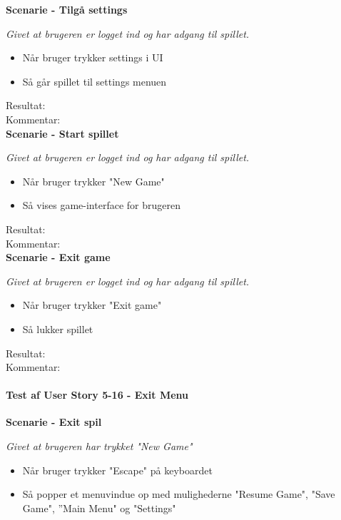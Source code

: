 \textbf{Scenarie - Tilgå settings}

\textit{Givet at brugeren er logget ind og har adgang til spillet.}

\begin{itemize}
  \item Når bruger trykker settings i UI
  \item Så går spillet til settings menuen
\end{itemize}

Resultat:\\
Kommentar:\\

\textbf{Scenarie - Start spillet}

\textit{Givet at brugeren er logget ind og har adgang til spillet.}

\begin{itemize}
  \item Når bruger trykker "New Game"
  \item Så vises game-interface for brugeren
\end{itemize}

Resultat:\\
Kommentar:\\

\textbf{Scenarie - Exit game}

\textit{Givet at brugeren er logget ind og har adgang til spillet.}

\begin{itemize}
  \item Når bruger trykker "Exit game"
  \item Så lukker spillet
\end{itemize}

Resultat:\\
Kommentar:\\

\paragraph{Test af User Story 5-16 - Exit Menu}

\textbf{Scenarie - Exit spil}

\textit{Givet at brugeren har trykket "New Game"}

\begin{itemize}
  \item Når bruger trykker "Escape" på keyboardet
  \item Så popper et menuvindue op med mulighederne "Resume Game", "Save Game", ”Main Menu" og "Settings"
\end{itemize}

